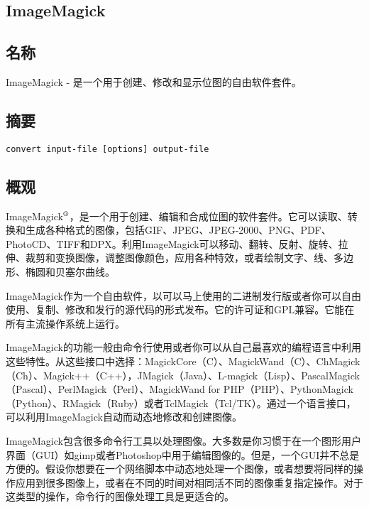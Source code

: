 \documentclass{article}
\begin{document}
\begin{CJK*}{UTF8}{gbsn}
\tableofcontents{}
\section{ImageMagick}
\subsection{名称}
ImageMagick - 是一个用于创建、修改和显示位图的自由软件套件。
\subsection{摘要}
\verb|convert input-file [options] output-file|
\subsection{概观}
ImageMagick$^{\text{\textregistered{}}}$，是一个用于创建、编辑和合成位图的软件套件。它可以读取、转换和生成各种格式的图像，包括GIF、JPEG、JPEG-2000、PNG、PDF、PhotoCD、TIFF和DPX。利用ImageMagick可以移动、翻转、反射、旋转、拉伸、裁剪和变换图像，调整图像颜色，应用各种特效，或者绘制文字、线、多边形、椭圆和贝塞尔曲线。

ImageMagick作为一个自由软件，以可以马上使用的二进制发行版或者你可以自由使用、复制、修改和发行的源代码的形式发布。它的许可证和GPL兼容。它能在所有主流操作系统上运行。

ImageMagick的功能一般由命令行使用或者你可以从自己最喜欢的编程语言中利用这些特性。从这些接口中选择：MagickCore（C）、MagickWand（C）、ChMagick（Ch）、Magick++（C++），JMagick（Java）、L-magick（Lisp）、PascalMagick（Pascal）、PerlMagick（Perl）、MagickWand for PHP（PHP）、PythonMagick（Python）、RMagick（Ruby）或者TclMagick（Tcl/TK）。通过一个语言接口，可以利用ImageMagick自动而动态地修改和创建图像。

ImageMagick包含很多命令行工具以处理图像。大多数是你习惯于在一个图形用户界面（GUI）如gimp或者Photoshop中用于编辑图像的。但是，一个GUI并不总是方便的。假设你想要在一个网络脚本中动态地处理一个图像，或者想要将同样的操作应用到很多图像上，或者在不同的时间对相同活不同的图像重复指定操作。对于这类型的操作，命令行的图像处理工具是更适合的。


\end{CJK*}
\end{document}
